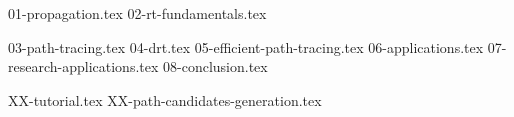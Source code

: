 \documentclass[
  draftbib,
  draftglossaries,
  f24paper,  %
  fontsize=10pt, %
  twoside=true, %
  secnumdepth=2, %
  listing=minted,
  numbers=noenddot,
]{kaobook}
\begin{document}
\mainmatter %


{01-propagation.tex}
{02-rt-fundamentals.tex}

%
{03-path-tracing.tex}
{04-drt.tex}
{05-efficient-path-tracing.tex}
%
%
{06-applications.tex}
{07-research-applications.tex}
{08-conclusion.tex}

\appendix %


{XX-tutorial.tex}
{XX-path-candidates-generation.tex}


\backmatter %




\printbibliography[heading=bibintoc, title=Bibliography, prenote=bibnote] %
\end{document}
